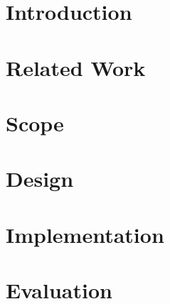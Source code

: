 \documentclass[a4paper,11pt,twoside]{memoir}
\begin{document}
	\captionnamefont{\bfseries}
	\frontmatter

	
	
	\cleardoublepage
	
	\cleardoublepage
	
	\cleardoublepage
	

	\setcounter{tocdepth}{1}
	\cleardoublepage
	\pagestyle{numberCorner}
	\tableofcontents*

	\mainmatter
	\pagestyle{numberCorner}

	\chapter{Introduction}
	
	
	
	\chapter{Related Work}
	
	\chapter{Scope}
	
	
	
	\chapter{Design}
	
	
	
	
	
	
	
	\chapter{Implementation}
	
	
	
	
	
	\chapter{Evaluation}
	
	

	\appendix
	
	
\end{document}

